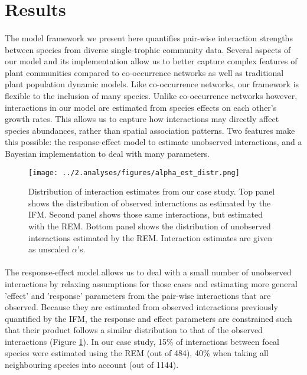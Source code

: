 \documentclass[a4,12pt]{article}
\begin{document}
\section{Results}

    \paragraph{}
    The model framework we present here quantifies pair-wise interaction strengths between species from diverse single-trophic community data. Several aspects of our model and its implementation allow us to better capture complex features of plant communities compared to co-occurrence networks as well as traditional plant population dynamic models. Like co-occurrence networks, our framework is flexible to the inclusion of many species. Unlike co-occurrence networks however, interactions in our model are estimated from species effects on each other's growth rates. This allows us to capture how interactions may directly affect species abundances, rather than spatial association patterns. Two features make this possible: the response-effect model to estimate unobserved interactions, and a Bayesian implementation to deal with many parameters. 

    \begin{figure}[H]
        \texttt{[image: ../2.analyses/figures/alpha\_est\_distr.png]}
        \caption{Distribution of interaction estimates from our case study. Top panel shows the distribution of observed interactions as estimated by the IFM. Second panel shows those same interactions, but estimated with the REM. Bottom panel shows the distribution of unobserved interactions estimated by the REM. Interaction estimates are given as unscaled \(\alpha\)'s.}
        \label{fig:adist}
    \end{figure}


    \paragraph{}
    The response-effect model allows us to deal with a small number of unobserved interactions by relaxing assumptions for those cases and estimating more general 'effect' and 'response' parameters from the pair-wise interactions that are observed. Because they are estimated from observed interactions previously quantified by the IFM, the response and effect parameters are constrained such that their product follows a similar distribution to that of the observed interactions (Figure \ref{fig:adist}). In our case study, 15\% of interactions between focal species were estimated using the REM (out of 484), 40\% when taking all neighbouring species into account (out of 1144). 
\end{document}
